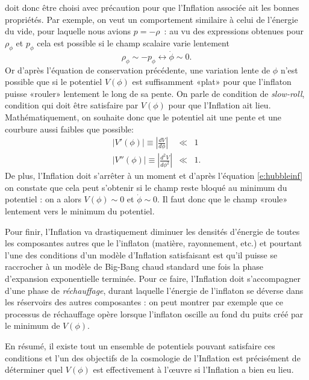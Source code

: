  doit donc être choisi avec précaution pour que l'Inflation associée ait les bonnes propriétés. Par exemple, on veut un comportement similaire à celui de l'énergie du vide, pour laquelle nous avions $p=-\rho$~: au vu des expressions obtenues pour $\rho_\phi$ et $p_\phi$ cela est possible si le champ scalaire varie lentement
\begin{equation}
\rho_\phi\sim -p_\phi \leftrightarrow \dot \phi \sim 0.
\end{equation}
Or d'après l'équation de conservation précédente, une variation lente de $\phi$ n'est possible que si le potentiel $V(\phi)$ est suffisamment «plat» pour que l'inflaton puisse «rouler» lentement le long de sa pente. On parle de condition de \textit{slow-roll}, condition qui doit être satisfaire par $V(\phi)$ pour que l'Inflation ait lieu. Mathématiquement, on souhaite donc que le potentiel ait une pente et une courbure aussi faibles que possible:
\begin{eqnarray}
|V'(\phi)|\equiv|\frac{d V}{d\phi}| &\ll& 1\\
|V''(\phi)|\equiv|\frac{d ^2 V}{d\phi^2}| &\ll& 1.
\end{eqnarray}
De plus, l'Inflation doit s'arrêter à un moment et d'après l'équation \ref{e:hubbleinf} on constate que cela peut s'obtenir si le champ reste bloqué au minimum du potentiel : on a alors $V(\phi)\sim 0$ et $\dot \phi \sim 0$. Il faut donc que le champ «roule» lentement vers le minimum du potentiel. 

Pour finir, l'Inflation va drastiquement diminuer les densités d'énergie de toutes les composantes autres que le l'inflaton (matière, rayonnement, etc.) et pourtant l'une des conditions d'un modèle d'Inflation satisfaisant est qu'il puisse se raccrocher à un modèle de Big-Bang chaud standard une fois la phase d'expansion exponentielle terminée. Pour ce faire, l'Inflation doit s'accompagner d'une phase de \textit{réchauffage}, durant laquelle l'énergie de l'inflaton se déverse dans les réservoirs des autres composantes : on peut montrer par exemple que ce processus de réchauffage opère lorsque l'inflaton oscille au fond du puits créé par le minimum de $V(\phi)$.


En résumé, il existe tout un ensemble de potentiels pouvant satisfaire ces conditions et l'un des objectifs de la cosmologie de l'Inflation est précisément de déterminer quel $V(\phi)$ est effectivement à l'œuvre si l'Inflation a bien eu lieu.




